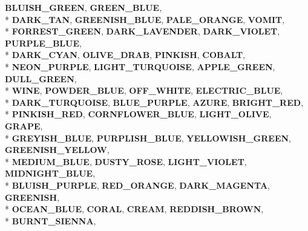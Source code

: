 \begin{DoxyCompactItemize}
{\bfseries B\+L\+U\+I\+S\+H\+\_\+\+G\+R\+E\+EN}, 
{\bfseries G\+R\+E\+E\+N\+\_\+\+B\+L\+UE}, 
\\*
{\bfseries D\+A\+R\+K\+\_\+\+T\+AN}, 
{\bfseries G\+R\+E\+E\+N\+I\+S\+H\+\_\+\+B\+L\+UE}, 
{\bfseries P\+A\+L\+E\+\_\+\+O\+R\+A\+N\+GE}, 
{\bfseries V\+O\+M\+IT}, 
\\*
{\bfseries F\+O\+R\+R\+E\+S\+T\+\_\+\+G\+R\+E\+EN}, 
{\bfseries D\+A\+R\+K\+\_\+\+L\+A\+V\+E\+N\+D\+ER}, 
{\bfseries D\+A\+R\+K\+\_\+\+V\+I\+O\+L\+ET}, 
{\bfseries P\+U\+R\+P\+L\+E\+\_\+\+B\+L\+UE}, 
\\*
{\bfseries D\+A\+R\+K\+\_\+\+C\+Y\+AN}, 
{\bfseries O\+L\+I\+V\+E\+\_\+\+D\+R\+AB}, 
{\bfseries P\+I\+N\+K\+I\+SH}, 
{\bfseries C\+O\+B\+A\+LT}, 
\\*
{\bfseries N\+E\+O\+N\+\_\+\+P\+U\+R\+P\+LE}, 
{\bfseries L\+I\+G\+H\+T\+\_\+\+T\+U\+R\+Q\+U\+O\+I\+SE}, 
{\bfseries A\+P\+P\+L\+E\+\_\+\+G\+R\+E\+EN}, 
{\bfseries D\+U\+L\+L\+\_\+\+G\+R\+E\+EN}, 
\\*
{\bfseries W\+I\+NE}, 
{\bfseries P\+O\+W\+D\+E\+R\+\_\+\+B\+L\+UE}, 
{\bfseries O\+F\+F\+\_\+\+W\+H\+I\+TE}, 
{\bfseries E\+L\+E\+C\+T\+R\+I\+C\+\_\+\+B\+L\+UE}, 
\\*
{\bfseries D\+A\+R\+K\+\_\+\+T\+U\+R\+Q\+U\+O\+I\+SE}, 
{\bfseries B\+L\+U\+E\+\_\+\+P\+U\+R\+P\+LE}, 
{\bfseries A\+Z\+U\+RE}, 
{\bfseries B\+R\+I\+G\+H\+T\+\_\+\+R\+ED}, 
\\*
{\bfseries P\+I\+N\+K\+I\+S\+H\+\_\+\+R\+ED}, 
{\bfseries C\+O\+R\+N\+F\+L\+O\+W\+E\+R\+\_\+\+B\+L\+UE}, 
{\bfseries L\+I\+G\+H\+T\+\_\+\+O\+L\+I\+VE}, 
{\bfseries G\+R\+A\+PE}, 
\\*
{\bfseries G\+R\+E\+Y\+I\+S\+H\+\_\+\+B\+L\+UE}, 
{\bfseries P\+U\+R\+P\+L\+I\+S\+H\+\_\+\+B\+L\+UE}, 
{\bfseries Y\+E\+L\+L\+O\+W\+I\+S\+H\+\_\+\+G\+R\+E\+EN}, 
{\bfseries G\+R\+E\+E\+N\+I\+S\+H\+\_\+\+Y\+E\+L\+L\+OW}, 
\\*
{\bfseries M\+E\+D\+I\+U\+M\+\_\+\+B\+L\+UE}, 
{\bfseries D\+U\+S\+T\+Y\+\_\+\+R\+O\+SE}, 
{\bfseries L\+I\+G\+H\+T\+\_\+\+V\+I\+O\+L\+ET}, 
{\bfseries M\+I\+D\+N\+I\+G\+H\+T\+\_\+\+B\+L\+UE}, 
\\*
{\bfseries B\+L\+U\+I\+S\+H\+\_\+\+P\+U\+R\+P\+LE}, 
{\bfseries R\+E\+D\+\_\+\+O\+R\+A\+N\+GE}, 
{\bfseries D\+A\+R\+K\+\_\+\+M\+A\+G\+E\+N\+TA}, 
{\bfseries G\+R\+E\+E\+N\+I\+SH}, 
\\*
{\bfseries O\+C\+E\+A\+N\+\_\+\+B\+L\+UE}, 
{\bfseries C\+O\+R\+AL}, 
{\bfseries C\+R\+E\+AM}, 
{\bfseries R\+E\+D\+D\+I\+S\+H\+\_\+\+B\+R\+O\+WN}, 
\\*
{\bfseries B\+U\+R\+N\+T\+\_\+\+S\+I\+E\+N\+NA}, 

\end{DoxyCompactItemize}
